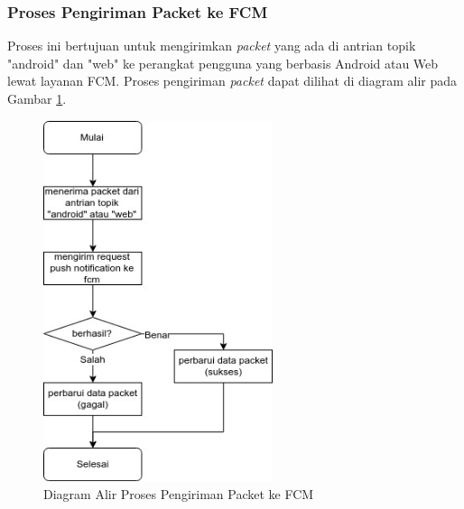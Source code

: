 \subsubsection{Proses Pengiriman Packet ke FCM}
\par Proses ini bertujuan untuk mengirimkan \textit{packet} yang ada di antrian topik "android" dan "web" ke perangkat pengguna yang berbasis Android atau Web lewat layanan FCM. Proses pengiriman \textit{packet} dapat dilihat di diagram alir pada Gambar \ref{flowchart_pengiriman_packet_ke_fcm}.
\begin{figure}[hb]
	\caption{Diagram Alir Proses Pengiriman Packet ke FCM} \label{flowchart_pengiriman_packet_ke_fcm}
    \centering\includegraphics[width=0.6\textwidth]{bab3/figures/flowchart_pengiriman_packet_ke_fcm.jpg}
\end{figure}
